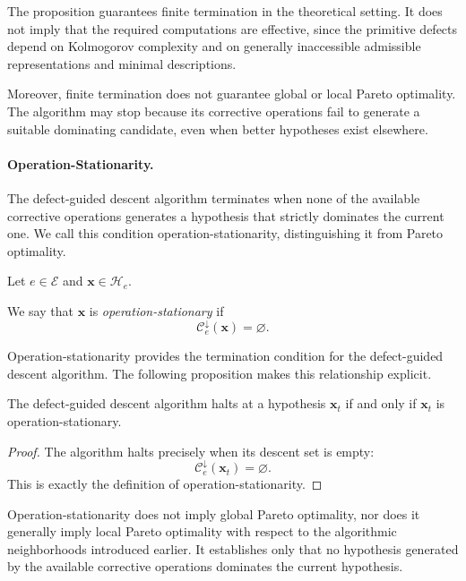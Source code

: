 The proposition guarantees finite termination in
the theoretical setting. It does not imply that
the required computations are effective, since
the primitive defects depend on Kolmogorov
complexity and on generally inaccessible
admissible representations and minimal descriptions.

Moreover, finite termination does not guarantee
global or local Pareto optimality. The algorithm
may stop because its corrective operations fail
to generate a suitable dominating candidate,
even when better hypotheses exist elsewhere.

\paragraph{Operation-Stationarity.}

The defect-guided descent algorithm terminates when
none of the available corrective operations generates
a hypothesis that strictly dominates the current one.
We call this condition operation-stationarity,
distinguishing it from Pareto optimality.

\begin{definition}
Let $e\in\mathcal E$ and
$\mathbf{x}\in\mathcal H_e$.

We say that $\mathbf{x}$ is
\emph{operation-stationary}
if
\[
\mathcal C_e^\downarrow(\mathbf{x})
=
\varnothing.
\]
\end{definition}

Operation-stationarity provides the termination
condition for the defect-guided descent algorithm.
The following proposition makes this relationship
explicit.

\begin{proposition}
\label{prop:halt_iff_stationary}
The defect-guided descent algorithm halts at
a hypothesis $\mathbf{x}_t$ if and only if
$\mathbf{x}_t$ is operation-stationary.
\end{proposition}

\begin{proof}
The algorithm halts precisely when its descent
set is empty:
\[
\mathcal C_e^\downarrow(\mathbf{x}_t)
=
\varnothing.
\]
This is exactly the definition of
operation-stationarity.
\end{proof}

Operation-stationarity does not imply global
Pareto optimality, nor does it generally imply
local Pareto optimality with respect to the
algorithmic neighborhoods introduced earlier.
It establishes only that no hypothesis generated
by the available corrective operations dominates
the current hypothesis.

